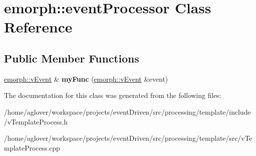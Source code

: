 \hypertarget{classemorph_1_1eventProcessor}{\section{emorph\-:\-:event\-Processor Class Reference}
\label{classemorph_1_1eventProcessor}
}
\subsection*{Public Member Functions}
\begin{DoxyCompactItemize}
\item 
\hypertarget{classemorph_1_1eventProcessor_a333c21041a0998eb2739900a0eb75752}{\hyperlink{classemorph_1_1vEvent}{emorph\-::v\-Event} \& {\bfseries my\-Func} (\hyperlink{classemorph_1_1vEvent}{emorph\-::v\-Event} \&event)}\label{classemorph_1_1eventProcessor_a333c21041a0998eb2739900a0eb75752}

\end{DoxyCompactItemize}


The documentation for this class was generated from the following files\-:\begin{DoxyCompactItemize}
\item 
/home/aglover/workspace/projects/event\-Driven/src/processing/template/include/v\-Template\-Process.\-h\item 
/home/aglover/workspace/projects/event\-Driven/src/processing/template/src/v\-Template\-Process.\-cpp\end{DoxyCompactItemize}

